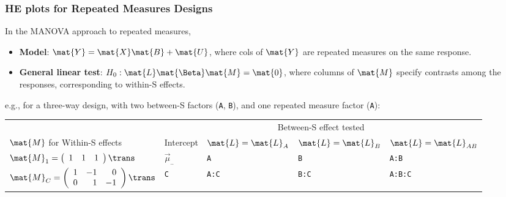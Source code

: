 \renewcommand{\FileName}{repeated}
\newcommand{\code}[1]{{\texttt{#1}}}
\begin{frame}
  \frametitle{HE plots for Repeated Measures Designs}
  In the MANOVA approach to repeated measures,
  \begin{itemize}
  	\item<1->{\large\bfseries Model}: $\mat{Y} = \mat{X} \mat{B} + \mat{U}$,
  	where cols of $\mat{Y}$ are repeated measures on the \alert{same} response.
	\item<1->{\large\bfseries General linear test}: 
$ H_0 : \mat{L} \mat{\Beta} \mat{M} = \mat{0}$,
where columns of $\mat{M}$  specify
contrasts among the responses, corresponding
to within-S effects.  
  \end{itemize}

e.g., for a three-way design, with two between-S factors (\code{A}, \code{B}),
and one repeated measure factor (\code{A}):
\vspace{.8ex}

\begin{center}
\begin{tabular}{|l|l|l|l|l|}
  \hline
    & \multicolumn{4}{c|}{Between-S effect tested} \\ \cline{2-5}
  $\mat{M}$ for Within-S effects & Intercept & $\mat{L} = \mat{L}_A$ & $\mat{L} = \mat{L}_B$ & $\mat{L} = \mat{L}_{AB}$ \\[1ex] \hline
  $\mat{M}_1 = \left(
                     \begin{array}{rrr}
                       1 & 1 & 1 \\
                     \end{array}
                    \right)\trans
  $  & $\vec{\mu}_{..}$ & \code{A} & \code{B} & \code{A:B}   \\ \hline
  $\mat{M}_C = \left(
                     \begin{array}{rrr}
                       1 & -1 & 0 \\
                       0 & 1 & -1 \\
                     \end{array}
                   \right)\trans
  $  & \code{C} & \code{A:C} & \code{B:C} & \code{A:B:C} \\
  \hline
\end{tabular}
\end{center}
\end{frame}

